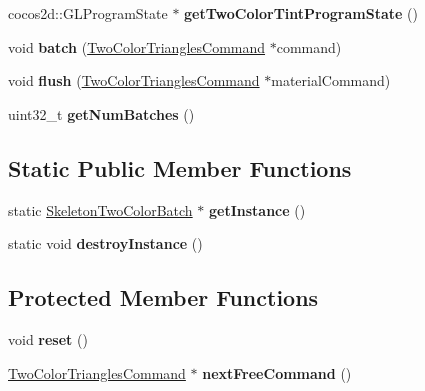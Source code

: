 \begin{DoxyCompactItemize}
cocos2d\+::\+G\+L\+Program\+State $\ast$ {\bfseries get\+Two\+Color\+Tint\+Program\+State} ()
\item 
\mbox{\label{classspine_1_1SkeletonTwoColorBatch_a6cdb09c47d4b25f2789a64166b6f08ff}} 
void {\bfseries batch} (\hyperlink{classspine_1_1TwoColorTrianglesCommand}{Two\+Color\+Triangles\+Command} $\ast$command)
\item 
\mbox{\label{classspine_1_1SkeletonTwoColorBatch_a545780760c3f874f1440ed7bf5ce85c1}} 
void {\bfseries flush} (\hyperlink{classspine_1_1TwoColorTrianglesCommand}{Two\+Color\+Triangles\+Command} $\ast$material\+Command)
\item 
\mbox{\label{classspine_1_1SkeletonTwoColorBatch_ac0d9ed549565ae16a6a83d0040215249}} 
uint32\+\_\+t {\bfseries get\+Num\+Batches} ()
\end{DoxyCompactItemize}
\subsection*{Static Public Member Functions}
\begin{DoxyCompactItemize}
\item 
\mbox{\label{classspine_1_1SkeletonTwoColorBatch_abacd6945d2558cf27d9fd04dff6de2b7}} 
static \hyperlink{classspine_1_1SkeletonTwoColorBatch}{Skeleton\+Two\+Color\+Batch} $\ast$ {\bfseries get\+Instance} ()
\item 
\mbox{\label{classspine_1_1SkeletonTwoColorBatch_a8ecc4cf3b181cb2bac2ad025c2f1a115}} 
static void {\bfseries destroy\+Instance} ()
\end{DoxyCompactItemize}
\subsection*{Protected Member Functions}
\begin{DoxyCompactItemize}
\item 
\mbox{\label{classspine_1_1SkeletonTwoColorBatch_a6185c1002742ff5be79c1c62588f0422}} 
void {\bfseries reset} ()
\item 
\mbox{\label{classspine_1_1SkeletonTwoColorBatch_a2ef0dd379c29cb6304c3d2aaa793dac8}} 
\hyperlink{classspine_1_1TwoColorTrianglesCommand}{Two\+Color\+Triangles\+Command} $\ast$ {\bfseries next\+Free\+Command} ()
\end{DoxyCompactItemize}
